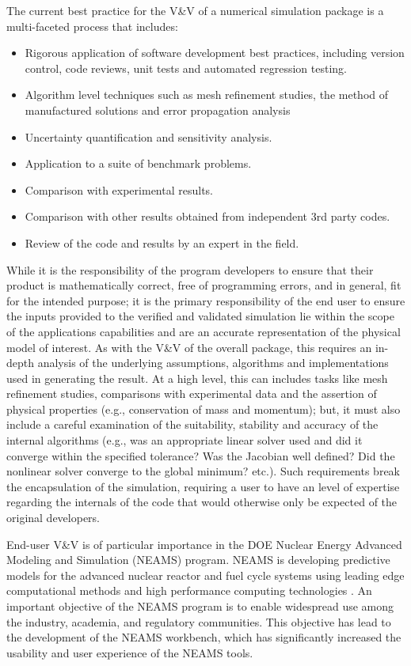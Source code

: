 The current best practice for the V&V of a numerical simulation package is a multi-faceted process that includes:
\begin{itemize}
 \item Rigorous application of software development best practices, including version control, code reviews, unit tests and automated regression testing. 
 \item Algorithm level techniques such as mesh refinement studies, the method of manufactured solutions and error propagation analysis
 \item Uncertainty quantification and sensitivity analysis. 
 \item Application to a suite of benchmark problems.
 \item Comparison with experimental results.
 \item Comparison with other results obtained from independent 3rd party codes.
 \item Review of the code and results by an expert in the field.
 \end{itemize}

While it is the responsibility of the program developers to ensure that their product is mathematically correct, free of programming errors, and in general, fit for the intended purpose; it is the primary responsibility of the end user to ensure the inputs provided to the verified and validated simulation lie within the scope of the applications capabilities and are an accurate representation of the physical model of interest. As with the V&V of the overall package, this requires an in-depth analysis of the underlying assumptions, algorithms and implementations used in generating the result. At a high level, this can includes tasks like mesh refinement studies, comparisons with experimental data and the assertion of physical properties (e.g., conservation of mass and momentum); but, it must also include a careful examination of the suitability, stability and accuracy of the internal algorithms (e.g., was an appropriate linear solver used and did it converge within the specified tolerance? Was the Jacobian well defined? Did the nonlinear solver converge to the global minimum? etc.). Such requirements break the encapsulation of the simulation, requiring a user to have an level of expertise regarding the internals of the code that would otherwise only be expected of the original developers. 

End-user V&V is of particular importance in the DOE Nuclear Energy Advanced Modeling and Simulation (NEAMS) program. NEAMS is developing predictive
models for the advanced nuclear reactor and fuel cycle systems using leading edge computational methods and high performance computing
technologies \cite{NEAMS}. An important objective of the NEAMS program is to enable widespread use among the industry, academia, and regulatory communities\cite{NEAMS}. This objective has lead to the 
development of the NEAMS workbench, which has significantly increased the usability and user experience of the NEAMS tools.

